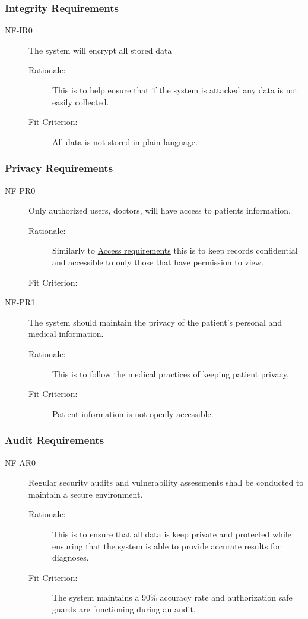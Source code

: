 \documentclass[12pt]{article}
\begin{document}
\subsubsection{Integrity Requirements}
\begin{description}
    \item[NF-IR0] The system will encrypt all stored data 
    \begin{description}
        \item[Rationale:] This is to help ensure that if the system is attacked any data is not easily collected. 
        \item[Fit Criterion:] All data is not stored in plain language. 
    \end{description}
\end{description}


\subsubsection{Privacy Requirements}
\begin{description}
    \item[NF-PR0] Only authorized users, doctors, will have access to patients information. 
    \begin{description}
        \item[Rationale:] Similarly to \hyperlink{AR0}{Access requirements} this is to keep records confidential and accessible to only those that have permission to view.
        \item[Fit Criterion:]
    \end{description}
    \item[NF-PR1] The system should maintain the privacy of the patient’s personal and medical information.
    \begin{description}
        \item[Rationale:] This is to follow the medical practices of keeping patient privacy. 
        \item[Fit Criterion:] Patient information is not openly accessible. 
    \end{description}
\end{description}


\subsubsection{Audit Requirements}
\begin{description}
    \item[NF-AR0] Regular security audits and vulnerability assessments shall be conducted to maintain a secure environment. 
    \begin{description}
        \item[Rationale:] This is to ensure that all data is keep private and protected while ensuring that the system is able to provide accurate results for diagnoses. 
        \item[Fit Criterion:] The system maintains a 90\% accuracy rate and authorization safe guards are functioning during an audit.
    \end{description}
\end{description}
\end{document}
